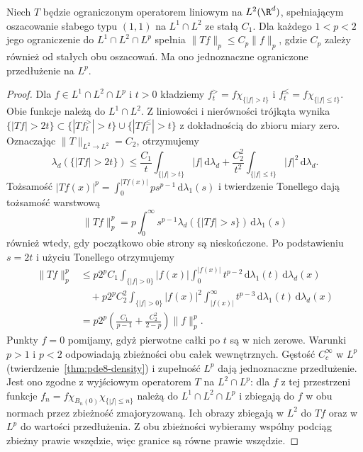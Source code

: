\begin{lemat}
\label{lem:pde16-interp}
Niech $T$ będzie ograniczonym operatorem liniowym
na $L^2(\R^d)$, spełniającym oszacowanie słabego typu
$(1,1)$ na $L^1\cap L^2$ ze stałą $C_1$.
Dla każdego $1<p<2$ jego ograniczenie do
$L^1\cap L^2\cap L^p$ spełnia
$\|Tf\|_p\le C_p\|f\|_p$, gdzie $C_p$ zależy również
od stałych obu oszacowań. Ma ono jednoznaczne
ograniczone przedłużenie na $L^p$.
\end{lemat}
\begin{proof}
Dla $f\in L^1\cap L^2\cap L^p$ i $t>0$ kładziemy
$f_t^{>}=f\chi_{\{|f|>t\}}$ i
$f_t^{\le}=f\chi_{\{|f|\le t\}}$.
Obie funkcje należą do $L^1\cap L^2$.
Z liniowości i nierówności trójkąta wynika
$\{|Tf|>2t\}\subset\{|Tf_t^{>}|>t\}
\cup\{|Tf_t^{\le}|>t\}$ z dokładnością do zbioru
miary zero. Oznaczając $\|T\|_{L^2\to L^2}=C_2$,
otrzymujemy
\[
 \lambda_d(\{|Tf|>2t\})
 \le \frac{C_1}{t}\int_{\{|f|>t\}}|f|\,\mathrm d\lambda_d
 +\frac{C_2^2}{t^2}\int_{\{|f|\le t\}}|f|^2\,\mathrm d\lambda_d .
\]
Tożsamość
$|Tf(x)|^p=\int_0^{|Tf(x)|}p s^{p-1}\,\mathrm d\lambda_1(s)$
i twierdzenie Tonellego dają tożsamość warstwową
\[
 \|Tf\|_p^p=p\int_0^\infty s^{p-1}
 \lambda_d(\{|Tf|>s\})\,\mathrm d\lambda_1(s)
\]
również wtedy, gdy początkowo obie strony są nieskończone.
Po podstawieniu $s=2t$ i użyciu Tonellego otrzymujemy
\[
 \begin{aligned}
 \|Tf\|_p^p
 &\le p2^p C_1\int_{\{|f|>0\}} |f(x)|
       \int_0^{|f(x)|}t^{p-2}\,\mathrm d\lambda_1(t)
       \,\mathrm d\lambda_d(x)\\
 &\quad+p2^p C_2^2\int_{\{|f|>0\}} |f(x)|^2
       \int_{|f(x)|}^\infty t^{p-3}\,\mathrm d\lambda_1(t)
       \,\mathrm d\lambda_d(x)\\
 &=p2^p\left(\frac{C_1}{p-1}+\frac{C_2^2}{2-p}\right)
   \|f\|_p^p .
 \end{aligned}
\]
Punkty $f=0$ pomijamy, gdyż pierwotne całki po $t$
są w nich zerowe. Warunki $p>1$ i $p<2$ odpowiadają
zbieżności obu całek wewnętrznych.
Gęstość $C_c^\infty$ w $L^p$
(twierdzenie~\ref{thm:pde8-density}) i zupełność $L^p$
dają jednoznaczne przedłużenie.
Jest ono zgodne z wyjściowym operatorem $T$ na
$L^2\cap L^p$: dla $f$ z tej przestrzeni funkcje
$f_n=f\chi_{B_n(0)}\chi_{\{|f|\le n\}}$
należą do $L^1\cap L^2\cap L^p$ i zbiegają do $f$
w obu normach przez zbieżność zmajoryzowaną.
Ich obrazy zbiegają w $L^2$ do $Tf$ oraz w $L^p$
do wartości przedłużenia. Z obu zbieżności wybieramy
wspólny podciąg zbieżny prawie wszędzie, więc granice
są równe prawie wszędzie.
\end{proof}

